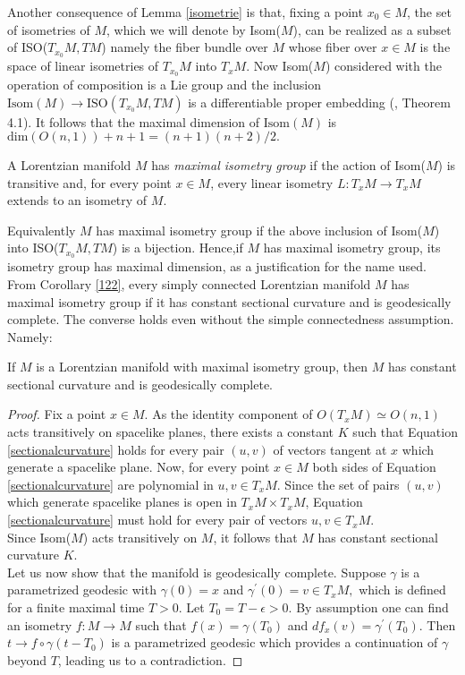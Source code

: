 Another consequence of Lemma \ref{isometrie} is that, fixing a point $x_0 \in M$, the set of isometries of $M$, which we will denote by Isom($M$), can be realized as a subset of ISO($T_{x_0}M, TM$) namely the fiber bundle over $M$ whose fiber over $x\in M$ is the space of linear isometries of $T_{x_0}M$ into $T_{x}M$. Now Isom($M$) considered with the operation of composition is a Lie group and the inclusion $\text{Isom}(M)\to \text{ISO}(T_{x_0}M, TM)$ is a differentiable proper embedding (\cite{okubo_1970}, Theorem 4.1). It follows that the maximal dimension of $\text{Isom}(M)$ is $\text{dim}(O(n,1))+n+1=(n+1)(n+2)/2.$

\begin{definition}
    A Lorentzian manifold $M$ has \textit{maximal isometry group} if the action of Isom($M$) is transitive and, for every point $x \in M$, every linear isometry $L:T_{x}M\to T_xM$ extends to an isometry of $M$. 
\end{definition}

Equivalently $M$ has maximal isometry group if the above inclusion of Isom($M$) into ISO($T_{x_0}M, TM$) is a bijection. Hence,if $M$ has maximal isometry group, its isometry group has maximal dimension, as a justification for the name used. 
From Corollary \ref{122}, every simply connected Lorentzian manifold $M$ has maximal isometry group if it has constant sectional curvature and is geodesically complete. The converse holds even without the simple connectedness assumption. Namely: 

\begin{lemma}\label{maximalisometry}
    If $M$ is a Lorentzian manifold with maximal isometry group, then $M$ has constant sectional curvature and is geodesically complete.
\end{lemma}

\begin{proof}
    Fix a point $x\in M$. As the identity component of $O(T_x M)\simeq O(n,1)$ acts transitively on spacelike planes, there exists a constant $K$ such that Equation \ref{sectionalcurvature} holds for every pair $(u,v)$ of vectors tangent at $x$ which generate a spacelike plane. Now, for every point $x\in M$ both sides of Equation \ref{sectionalcurvature} are polynomial in $u,v \in T_xM$. Since the set of pairs $(u,v)$ which generate spacelike planes is open in $T_{x}M\times T_{x}M$, Equation \ref{sectionalcurvature} must hold for every pair of vectors $u,v \in T_xM$.\\ Since Isom($M$) acts transitively on $M$, it follows that $M$ has constant sectional curvature $K$.\\
    Let us now show that the manifold is geodesically complete. Suppose $\gamma$ is a parametrized geodesic with $\gamma(0)=x$ and $\gamma^{\prime} (0)=v\in T_xM,$ which is defined for a finite maximal time $T>0.$ Let $T_0=T-\epsilon>0.$ By assumption one can find an isometry $f:M\to M$ such that $f(x)=\gamma(T_0)$ and $df_x(v)=\gamma^{\prime}(T_0).$ Then $t\to f\circ\gamma(t-T_0)$ is a parametrized geodesic which provides a continuation of $\gamma$ beyond $T$, leading us to a contradiction. 
\end{proof}

